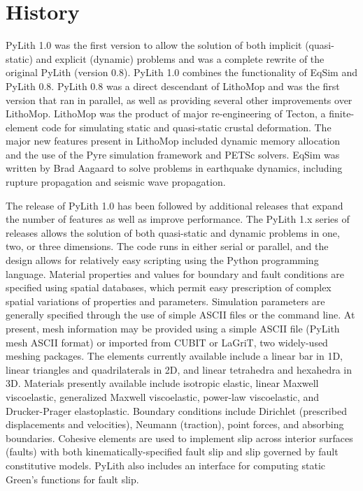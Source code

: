 \section{History}

PyLith 1.0 was the first version to allow the solution of both
implicit (quasi-static) and explicit (dynamic) problems and was a
complete rewrite of the original PyLith (version 0.8). PyLith 1.0
combines the functionality of EqSim
\cite{Aagaard:etal:2001a,Aagaard:etal:2001b} and PyLith 0.8. PyLith
0.8 was a direct descendant of LithoMop and was the first version that
ran in parallel, as well as providing several other improvements over
LithoMop. LithoMop was the product of major re-engineering of Tecton, a
finite-element code for simulating static and quasi-static crustal
deformation. The major new features present in LithoMop included
dynamic memory allocation and the use of the Pyre simulation framework
and PETSc solvers. EqSim was written by Brad Aagaard to solve problems
in earthquake dynamics, including rupture propagation and seismic wave
propagation.

The release of PyLith 1.0 has been followed by additional releases
that expand the number of features as well as improve performance.
The PyLith 1.x series of releases allows the solution of both
quasi-static and dynamic problems in one, two, or three
dimensions. The code runs in either serial or parallel, and the design
allows for relatively easy scripting using the Python programming
language. Material properties and values for boundary and fault
conditions are specified using spatial databases, which permit easy
prescription of complex spatial variations of properties and
parameters. Simulation parameters are generally specified through the
use of simple ASCII files or the command line.  At present, mesh
information may be provided using a simple ASCII file (PyLith mesh
ASCII format) or imported from CUBIT or LaGriT, two widely-used
meshing packages. The elements currently available include a linear
bar in 1D, linear triangles and quadrilaterals in 2D, and linear
tetrahedra and hexahedra in 3D. Materials presently available include
isotropic elastic, linear Maxwell viscoelastic, generalized Maxwell
viscoelastic, power-law viscoelastic, and Drucker-Prager
elastoplastic. Boundary conditions include Dirichlet (prescribed
displacements and velocities), Neumann (traction), point forces, and
absorbing boundaries.  Cohesive elements are used to implement slip
across interior surfaces (faults) with both kinematically-specified
fault slip and slip governed by fault constitutive models. PyLith also
includes an interface for computing static Green's functions for fault
slip.

